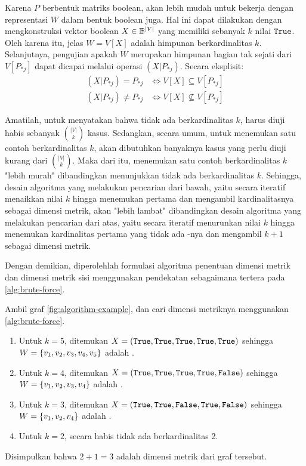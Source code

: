 Karena \(P\) berbentuk matriks boolean, akan lebih mudah untuk bekerja dengan representasi \(W\) dalam bentuk boolean juga. Hal ini dapat dilakukan dengan mengkonstruksi vektor boolean \(X \in \Bbb^{|V|}\) yang memiliki sebanyak \(k\) nilai \(\True\). Oleh karena itu, jelas \(W = V[X]\) adalah himpunan berkardinalitas \(k\). Selanjutnya, pengujian apakah \(W\) merupakan himpunan bagian tak sejati dari \(V[P_{*j}]\) dapat dicapai melalui operasi \((X|P_{*j})\). Secara eksplisit:
\[
	\begin{array}{rl}
		(X|P_{*j}) = P_{*j}  &\iff V[X] \subseteq V[P_{*j}] \\
		(X|P_{*j}) \neq P_{*j}  &\iff V[X] \not\subseteq V[P_{*j}]
	\end{array}
\]

Amatilah, untuk menyatakan bahwa tidak ada  berkardinalitas \(k\), harus diuji habis sebanyak \(\binom{|V|}{k}\) kasus. Sedangkan, secara umum, untuk menemukan satu contoh  berkardinalitas \(k\), akan dibutuhkan banyaknya kasus yang perlu diuji kurang dari \(\binom{|V|}{k}\). Maka dari itu, menemukan satu contoh  berkardinalitas \(k\) "lebih murah" dibandingkan menunjukkan tidak ada  berkardinalitas \(k\). Sehingga, desain algoritma yang melakukan pencarian dari bawah, yaitu secara iteratif menaikkan nilai \(k\) hingga menemukan  pertama dan mengambil kardinalitasnya sebagai dimensi metrik, akan "lebih lambat" dibandingkan desain algoritma yang melakukan pencarian dari atas, yaitu secara iteratif menurunkan nilai \(k\) hingga menemukan kardinalitas pertama yang tidak ada -nya dan mengambil \(k + 1\) sebagai dimensi metrik.

Dengan demikian, diperolehlah formulasi algoritma penentuan dimensi metrik dan dimensi metrik sisi menggunakan pendekatan  sebagaimana tertera pada \autoref{alg:brute-force}.

\begin{example}
	Ambil graf \autoref{fig:algorithm-example}, dan cari dimensi metriknya menggunakan \autoref{alg:brute-force}.
	\begin{enumerate}
		\item Untuk \(k = 5\), ditemukan \(X = (\True, \True, \True, \True, \True)\) sehingga \(W = \{v_1, v_2,\\ v_3, v_4, v_5\}\) adalah .
		\item Untuk \(k = 4\), ditemukan \(X = (\True, \True, \True, \True, \False)\) sehingga \(W = \{v_1, v_2,\\ v_3, v_4\}\) adalah .
		\item Untuk \(k = 3\), ditemukan \(X = (\True, \True, \False, \True, \False)\) sehingga \(W = \{v_1, v_2,\\ v_4\}\) adalah .
		\item Untuk \(k = 2\), secara habis tidak ada  berkardinalitas 2.
	\end{enumerate}
	Disimpulkan bahwa \(2 + 1 = 3\) adalah dimensi metrik dari graf tersebut.
\end{example}

